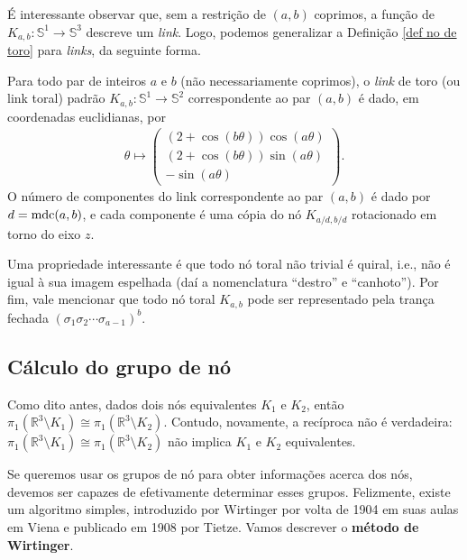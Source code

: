 	É interessante observar que, sem a restrição de $(a,b)$ coprimos, a função de
	$K_{a,b}:\mathbb{S}^1\to\mathbb{S}^3$ descreve um \textit{link}. Logo, 
	podemos generalizar a Definição \ref{def no de toro} para \textit{links}, da seguinte forma.
	\begin{definition}
	\label{def link de toro}
		Para todo par de inteiros $a$ e $b$ (não necessariamente coprimos), o 
		\textit{link} de toro (ou link toral) padrão $K_{a,b}: \mathbb{S}^1\to\mathbb{S}^2$ 
		correspondente ao par $(a,b)$ é dado, em coordenadas euclidianas, por
		\begin{align*}
    		\theta\mapsto
    		\left( 
    		\begin{matrix}
    		(2+\cos(b\theta))\cos(a\theta) \\
    		(2+\cos(b\theta))\sin(a\theta) \\
    		-\sin(a\theta)
    		\end{matrix} 
    		\right).
		\end{align*}
		O número de componentes do link correspondente ao par $(a,b)$ é dado por $d = \operatorname{mdc}(a,b)$, 
		e cada componente é uma cópia do nó $\displaystyle{K_{a/d, b/d}}$ rotacionado em torno do eixo $z$.
	\end{definition}
	Uma propriedade interessante é que todo nó toral não trivial é quiral, i.e., não é igual 
	à sua imagem espelhada (daí a nomenclatura ``destro'' e ``canhoto''). Por fim, vale 
	mencionar que todo nó toral $K_{a,b}$ pode ser representado pela trança fechada
	$(\sigma_1\sigma_2\cdots\sigma_{a-1})^b$.  
	
	\subsection*{Cálculo do grupo de nó}
	Como dito antes, dados dois nós equivalentes $K_1$ e $K_2$, então 
	$\pi_1(\mathbb{R}^3\setminus K_1) \cong \pi_1(\mathbb{R}^3\setminus K_2)$. Contudo, 
	novamente, a recíproca não é verdadeira: 
	$\pi_1(\mathbb{R}^3\setminus K_1) \cong \pi_1(\mathbb{R}^3\setminus K_2)$ não implica 
	$K_1$ e $K_2$ equivalentes.
	
	\par\vspace{0.3cm} Se queremos usar os grupos de nó para obter informações acerca dos nós, 
	devemos ser capazes de efetivamente determinar esses grupos. Felizmente, existe um algoritmo 
	simples, introduzido por Wirtinger por volta de 1904 em suas aulas em Viena e publicado em 
	1908 por Tietze. Vamos descrever o \textbf{método de Wirtinger}.
	
